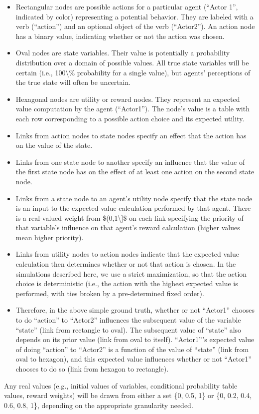 \documentclass{article}%
\begin{document}
%
\begin{itemize}%
\item%
Rectangular nodes are possible actions for a particular agent (``Actor 1'', indicated by color) representing a potential behavior. They are labeled with a verb (``action'') and an optional object of the verb (``Actor2''). An action node has a binary value, indicating whether or not the action was chosen.%
\item%
Oval nodes are state variables. Their value is potentially a probability distribution over a domain of possible values. All true state variables will be certain (i.e., 100\textbackslash{}\% probability for a single value), but agents' perceptions of the true state will often be uncertain.%
\item%
Hexagonal nodes are utility or reward nodes. They represent an expected value computation by the agent (``Actor1''). The node's value is a table with each row corresponding to a possible action choice and its expected utility.%
\item%
Links from action nodes to state nodes specify an effect that the action has on the value of the state.%
\item%
Links from one state node to another specify an influence that the value of the first state node has on the effect of at least one action on the second state node.%
\item%
Links from a state node to an agent's utility node specify that the state node is an input to the expected value calculation performed by that agent. There is a real{-}valued weight from \$(0,1\textbackslash{}{]}\$ on each link specifying the priority of that variable's influence on that agent's reward calculation (higher values mean higher priority).%
\item%
Links from utility nodes to action nodes indicate that the expected value calculation then determines whether or not that action is chosen. In the simulations described here, we use a strict maximization, so that the action choice is deterministic (i.e., the action with the highest expected value is performed, with ties broken by a pre{-}determined fixed order).%
\item%
Therefore, in the above simple ground truth, whether or not ``Actor1'' chooses to do ``action'' to ``Actor2'' influences the subsequent value of the variable ``state'' (link from rectangle to oval). The subsequent value of ``state'' also depends on its prior value (link from oval to itself). ``Actor1'''s expected value of doing ``action'' to ``Actor2'' is a function of the value of ``state'' (link from oval to hexagon), and this expected value influences whether or not ``Actor1'' chooses to do so (link from hexagon to rectangle).%
\end{itemize}%
Any real values (e.g., initial values of variables, conditional probability table values, reward weights) will be drawn from either a set \{0, 0.5, 1\} or \{0, 0.2, 0.4, 0.6, 0.8, 1\}, depending on the appropriate granularity needed.
\end{document}
